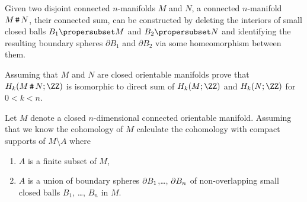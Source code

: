 


\exercises
Given two disjoint connected $n$-manifolds $M$ and $N$, a
connected $n$-manifold $M\mathop{\texttt{\#}}\nolimits{N}$, their connected
sum, can be constructed
by deleting the interiors of small closed balls $B_1\propersubset
M$ and $B_2\propersubset N$ and identifying the resulting
boundary spheres $\partial B_1$ and $\partial B_2$ via some 
homeomorphism between them.
\begin{xca}
Assuming that $M$ and $N$ are closed orientable manifolds prove
that $H_k(M\connectSum{N}; \ZZ)$ is isomorphic to direct sum of
$H_k(M; \ZZ)$ and $H_k(N; \ZZ)$ for $0 < k < n$.
\end{xca}
\begin{xca}
Let $M$ denote a closed $n$-dimensional connected orientable
manifold. Assuming that we know the cohomology of $M$ calculate
the cohomology with compact supports of $M \setminus A$ where
\begin{enumerate}
\item $A$ is a finite subset of $M$,
\item $A$ is a union of boundary spheres $\partial B_1$,\dots,
  $\partial B_n$ of non-overlapping small closed balls $B_1$, \dots,
  $B_n$ in $M$.
\end{enumerate}
\end{xca}

